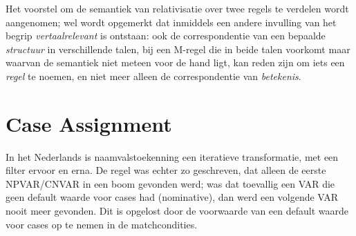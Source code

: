 Het voorstel om de semantiek van relativisatie over twee regels te verdelen wordt 
aangenomen; wel wordt opgemerkt dat inmiddels een andere invulling van het 
begrip {\em vertaalrelevant\/} is ontstaan: ook de correspondentie van een 
bepaalde 
{\em structuur\/} in verschillende talen, bij een M-regel die in beide talen 
voorkomt maar waarvan de semantiek 
niet meteen voor de hand ligt, kan reden zijn om iets een {\em regel\/} te 
noemen, en niet meer 
alleen de correspondentie van {\em betekenis\/}.

\section{Case Assignment}
In het Nederlands is naamvalstoekenning een iteratieve transformatie, met een 
filter ervoor en erna. De regel was echter zo geschreven, dat alleen de eerste 
NPVAR/CNVAR in een boom gevonden werd; was dat toevallig een VAR die geen 
default waarde voor cases had (nominative), dan werd een volgende VAR nooit 
meer gevonden. Dit is opgelost door de voorwaarde van een default waarde voor 
cases op te nemen in de matchcondities.

